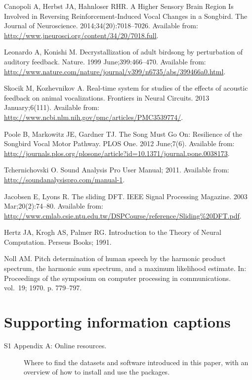 \documentclass[10pt,letterpaper]{article}
\begin{document}
\begin{thebibliography}{10}
Canopoli A, Herbst JA, Hahnloser RHR.
\newblock A Higher Sensory Brain Region Is Involved in Reversing
  Reinforcement-Induced Vocal Changes in a Songbird.
\newblock The Journal of Neuroscience. 2014;34(20):7018--7026.
\newblock Available from:
  \url{http://www.jneurosci.org/content/34/20/7018.full}.

Leonardo A, Konishi M.
\newblock Decrystallization of adult birdsong by perturbation of auditory
  feedback.
\newblock Nature. 1999 June;399:466--470.
\newblock Available from:
  \url{http://www.nature.com/nature/journal/v399/n6735/abs/399466a0.html}.

Skocik M, Kozhevnikov A.
\newblock Real-time system for studies of the effects of acoustic feedback on
  animal vocalizations.
\newblock Frontiers in Neural Circuits. 2013 January;6(111).
\newblock Available from:
  \url{http://www.ncbi.nlm.nih.gov/pmc/articles/PMC3539774/}.

Poole B, Markowitz JE, Gardner TJ.
\newblock The Song Must Go On: Resilience of the Songbird Vocal Motor Pathway.
\newblock PLOS One. 2012 June;7(6).
\newblock Available from:
  \url{http://journals.plos.org/plosone/article?id=10.1371/journal.pone.0038173}.

Tchernichovski O. Sound Analysis Pro User Manual; 2011.
\newblock Available from: \url{http://soundanalysispro.com/manual-1}.

Jacobsen E, Lyons R.
\newblock The sliding DFT.
\newblock IEEE Signal Processing Magazine. 2003 Mar;20(2):74--80.
\newblock Available from:
  \url{http://www.cmlab.csie.ntu.edu.tw/DSPCourse/reference/Sliding\%20DFT.pdf}.

Hertz JA, Krogh AS, Palmer RG.
\newblock Introduction to the Theory of Neural Computation.
\newblock Perseus Books; 1991.

Noll AM.
\newblock Pitch determination of human speech by the harmonic product spectrum,
  the harmonic sum spectrum, and a maximum likelihood estimate.
\newblock In: Proceedings of the symposium on computer processing in
  communications. vol.~19; 1970. p. 779--797.

\end{thebibliography}

\section{Supporting information captions}

\begin{description}
  \item[S1 Appendix A: Online resources.] Where to find the datasets and software introduced in this paper, with an overview of how to install and use the packages.
\end{description}
\end{document}
